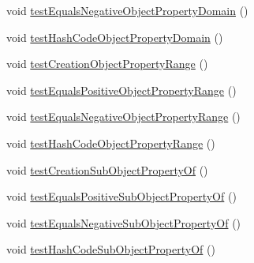 \begin{DoxyCompactItemize}
\item 
void \hyperlink{classorg_1_1semanticweb_1_1owlapi_1_1datafactory_1_1_o_w_l_data_factory_test_case_a95a4899a80949b54cb134d33ccb5a3f2}{test\-Equals\-Negative\-Object\-Property\-Domain} ()
\item 
void \hyperlink{classorg_1_1semanticweb_1_1owlapi_1_1datafactory_1_1_o_w_l_data_factory_test_case_ac176f91329e034a6f99cf4f35299ffa1}{test\-Hash\-Code\-Object\-Property\-Domain} ()
\item 
void \hyperlink{classorg_1_1semanticweb_1_1owlapi_1_1datafactory_1_1_o_w_l_data_factory_test_case_aadf491232c5f254b7ecbae823b30c2b6}{test\-Creation\-Object\-Property\-Range} ()
\item 
void \hyperlink{classorg_1_1semanticweb_1_1owlapi_1_1datafactory_1_1_o_w_l_data_factory_test_case_abd9a62f627e3d4c9aa79c700466b01b4}{test\-Equals\-Positive\-Object\-Property\-Range} ()
\item 
void \hyperlink{classorg_1_1semanticweb_1_1owlapi_1_1datafactory_1_1_o_w_l_data_factory_test_case_a16d823380e5224877e0df1aa9c4ad90f}{test\-Equals\-Negative\-Object\-Property\-Range} ()
\item 
void \hyperlink{classorg_1_1semanticweb_1_1owlapi_1_1datafactory_1_1_o_w_l_data_factory_test_case_a0e4b316665c061a95f950359436dacf4}{test\-Hash\-Code\-Object\-Property\-Range} ()
\item 
void \hyperlink{classorg_1_1semanticweb_1_1owlapi_1_1datafactory_1_1_o_w_l_data_factory_test_case_a89e0e9bd08714f654c88bd3b4acd7e21}{test\-Creation\-Sub\-Object\-Property\-Of} ()
\item 
void \hyperlink{classorg_1_1semanticweb_1_1owlapi_1_1datafactory_1_1_o_w_l_data_factory_test_case_a60bd0c4a1c4cdf50ed5b12489c91e2f5}{test\-Equals\-Positive\-Sub\-Object\-Property\-Of} ()
\item 
void \hyperlink{classorg_1_1semanticweb_1_1owlapi_1_1datafactory_1_1_o_w_l_data_factory_test_case_a63a59af2e17b77709af47d0ab368bee4}{test\-Equals\-Negative\-Sub\-Object\-Property\-Of} ()
\item 
void \hyperlink{classorg_1_1semanticweb_1_1owlapi_1_1datafactory_1_1_o_w_l_data_factory_test_case_a739688094330773fa775e04eec068898}{test\-Hash\-Code\-Sub\-Object\-Property\-Of} ()
\end{DoxyCompactItemize}
